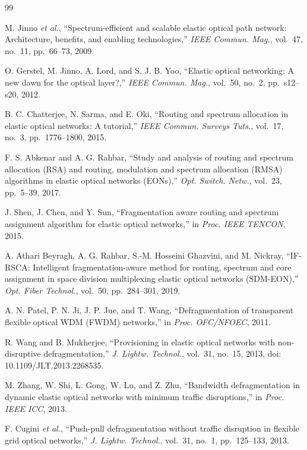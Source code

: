 \documentclass[conference]{IEEEtran}
\begin{document}
\begin{thebibliography}{99}

M. Jinno \textit{et al.}, ``Spectrum-efficient and scalable elastic optical path network: Architecture, benefits, and enabling technologies,'' \textit{IEEE Commun. Mag.}, vol.~47, no.~11, pp.~66--73, 2009.

O. Gerstel, M. Jinno, A. Lord, and S. J. B. Yoo, ``Elastic optical networking: A new dawn for the optical layer?,'' \textit{IEEE Commun. Mag.}, vol.~50, no.~2, pp.~s12--s20, 2012.

B. C. Chatterjee, N. Sarma, and E. Oki, ``Routing and spectrum allocation in elastic optical networks: A tutorial,'' \textit{IEEE Commun. Surveys Tuts.}, vol.~17, no.~3, pp.~1776--1800, 2015.

F. S. Abkenar and A. G. Rahbar, ``Study and analysis of routing and spectrum allocation (RSA) and routing, modulation and spectrum allocation (RMSA) algorithms in elastic optical networks (EONs),'' \textit{Opt. Switch. Netw.}, vol.~23, pp.~5--39, 2017.

J. Shen, J. Chen, and Y. Sun, ``Fragmentation aware routing and spectrum assignment algorithm for elastic optical networks,'' in \textit{Proc. IEEE TENCON}, 2015.

A. Athari Beyragh, A. G. Rahbar, S.-M. Hosseini Ghazvini, and M. Nickray, ``IF-RSCA: Intelligent fragmentation-aware method for routing, spectrum and core assignment in space division multiplexing elastic optical networks (SDM-EON),'' \textit{Opt. Fiber Technol.}, vol.~50, pp.~284--301, 2019.

A. N. Patel, P. N. Ji, J. P. Jue, and T. Wang, ``Defragmentation of transparent flexible optical WDM (FWDM) networks,'' in \textit{Proc. OFC/NFOEC}, 2011.

R. Wang and B. Mukherjee, ``Provisioning in elastic optical networks with non-disruptive defragmentation,'' \textit{J. Lightw. Technol.}, vol.~31, no.~15, 2013, doi: 10.1109/JLT.2013.2268535.

M. Zhang, W. Shi, L. Gong, W. Lu, and Z. Zhu, ``Bandwidth defragmentation in dynamic elastic optical networks with minimum traffic disruptions,'' in \textit{Proc. IEEE ICC}, 2013.

F. Cugini \textit{et al.}, ``Push-pull defragmentation without traffic disruption in flexible grid optical networks,'' \textit{J. Lightw. Technol.}, vol.~31, no.~1, pp.~125--133, 2013.


\end{thebibliography}
\end{document}
